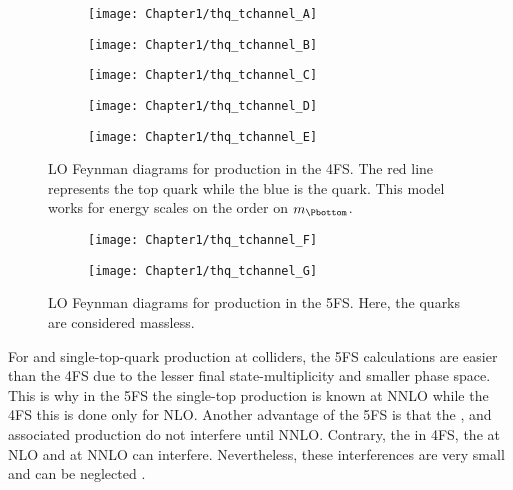 \begin{figure}
\centering
\begin{subfigure}{.31\textwidth}
  \centering
  \texttt{[image: Chapter1/thq\_tchannel\_A]}
  \caption{}
  \label{fig:Chap1:tH:tchannel:4F:A}
\end{subfigure}%
\begin{subfigure}{.31\textwidth}
  \centering
  \texttt{[image: Chapter1/thq\_tchannel\_B]}
  \caption{}
  \label{fig:Chap1:tH:tchannel:4F:B}
\end{subfigure} 
\begin{subfigure}{.31\textwidth}
  \centering
  \texttt{[image: Chapter1/thq\_tchannel\_C]}
  \caption{}
  \label{fig:Chap1:tH:tchannel:4F:C}
\end{subfigure} \quad
\begin{subfigure}{.31\textwidth}
  \centering
  \texttt{[image: Chapter1/thq\_tchannel\_D]}
  \caption{}
  \label{fig:Chap1:tH:tchannel:4F:D}
\end{subfigure} %
\begin{subfigure}{.31\textwidth}
  \centering
  \texttt{[image: Chapter1/thq\_tchannel\_E]}
  \caption{}
  \label{fig:Chap1:tH:tchannel:4F:E}
\end{subfigure}%
\caption{LO Feynman diagrams for \tchannel \tH production in the 4FS. 
The red line represents the top quark while the blue is the \Pbottom quark.
This model works for energy scales on the order on $m_{\Pbottom}$.}
\label{fig:Chap1:tH:tchannel:4F}
\end{figure}

\begin{figure}
\centering
\begin{subfigure}{.5\textwidth}
  \centering
  \texttt{[image: Chapter1/thq\_tchannel\_F]}
  \caption{}
  \label{fig:Chap1:tH:tchannel:5F:A}
\end{subfigure}%
\begin{subfigure}{.4\textwidth}
  \centering
  \texttt{[image: Chapter1/thq\_tchannel\_G]}
  \caption{}
  \label{fig:Chap1:tH:tchannel:5F:B}
\end{subfigure}%
\caption{LO Feynman diagrams for \tchannel \tH production in 
the 5FS. Here, the \Pbottom quarks are considered massless.}
\label{fig:Chap1:tH:tchannel:5F}
\end{figure}


For \tHq and single-top-quark production at colliders, the 5FS calculations are easier 
than the 4FS due to the lesser final state-multiplicity and smaller phase space. 
This is why in the 5FS the single-top production
is known at NNLO while the 4FS this is done only for NLO. Another advantage of 
the 5FS is that the \tchannel, \schannel and associated \tWH production 
do not interfere until NNLO. Contrary, the in 4FS, the
\tchannel at NLO and \schannel at NNLO can interfere. 
Nevertheless, these interferences are very small and can be neglected \cite{Demartin:2015uha}.

